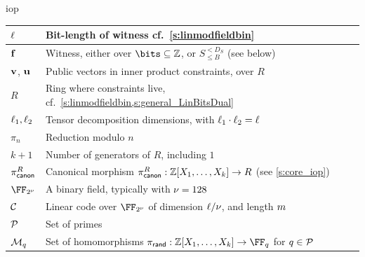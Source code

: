 \begin{lncsappendix}{iop}
\begin{table}[H]
    \centering
    \begin{tabular}{l|l}
    \toprule
        $\ell$ & Bit-length of witness cf.\ \cref{s:linmodfieldbin}\\
        \hline
        $\mathbf{f}$ & Witness, either over $\bits\subseteq \ZZ$, or $S_{\leq B}^{<D_S}$ (see below)\\
        \hline
        $\mathbf{v}$, $\mathbf{u}$ & Public vectors in inner product constraints, over $R$\\
        \hline
         $R$ & Ring where constraints live, cf.\ \cref{s:linmodfieldbin,s:general_LinBitsDual}\\
         \hline
    $\ell_1,\ell_2$ & Tensor decomposition dimensions, with $\ell_1\cdot\ell_2=\ell$\\
         \hline
                  $\pi_n$ & Reduction modulo $n$\\
                          \hline $k+1$ & Number of generators of $R$, including $1$ \\
                  \hline
         $\pi_{\mathsf{canon}}^R$ & Canonical morphism $\pi_{\mathsf{canon}}^R: \mathbb{Z}[X_1,\ldots, X_k] \to R$ (see \cref{s:core_iop})\\
          \hline
        $\comfield$ & A binary field, typically with $\nu=128$ \\
                 \hline
         $\mathcal{C}$ & Linear code over $\comfield$ of dimension $\ell/\nu$, and length $m$\\
         \hline
         $\mathcal{P}$ & Set of primes\\
         \hline
         $\mathcal{M}_q$ & Set of homomorphisms $\pirand:\ZZ[X_1,\ldots, X_k] \to \FF_q$ for $q\in \mathcal{P}$\\
         \hline
         

\end{tabular}
\end{table}
\end{lncsappendix}
